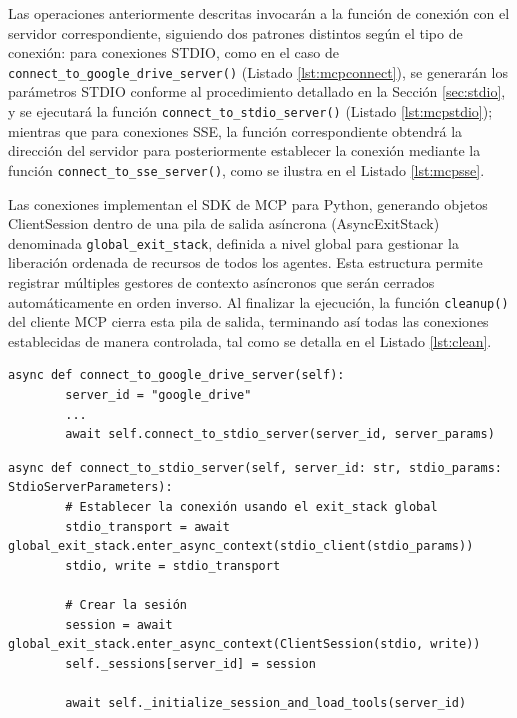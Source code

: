 Las operaciones anteriormente descritas invocarán a la función de conexión con el servidor correspondiente, siguiendo dos patrones distintos según el tipo de conexión: para conexiones STDIO, como en el caso de \texttt{connect\_to\_google\_drive\_server()} (Listado \ref{lst:mcpconnect}), se generarán los parámetros STDIO conforme al procedimiento detallado en la Sección \ref{sec:stdio}, y se ejecutará la función \texttt{connect\_to\_stdio\_server()} (Listado \ref{lst:mcpstdio}); mientras que para conexiones SSE, la función correspondiente obtendrá la dirección del servidor para posteriormente establecer la conexión mediante la función \texttt{connect\_to\_sse\_server()}, como se ilustra en el Listado \ref{lst:mcpsse}.

Las conexiones implementan el SDK de MCP para Python, generando objetos ClientSession dentro de una pila de salida asíncrona (AsyncExitStack) denominada \texttt{global\_exit\_stack}, definida a nivel global para gestionar la liberación ordenada de recursos de todos los agentes. Esta estructura permite registrar múltiples gestores de contexto asíncronos que serán cerrados automáticamente en orden inverso. Al finalizar la ejecución, la función \texttt{cleanup()} del cliente MCP cierra esta pila de salida, terminando así todas las conexiones establecidas de manera controlada, tal como se detalla en el Listado \ref{lst:clean}. 

\begin{lstlisting}[caption={mcp\_multi\_client.py: función \texttt{connect\_to\_google\_drive\_server en Cliente MCP}},label={lst:mcpconnect}]
    async def connect_to_google_drive_server(self):
        server_id = "google_drive"
        ...
        await self.connect_to_stdio_server(server_id, server_params)
\end{lstlisting}

\begin{lstlisting}[caption={mcp\_multi\_client.py: función \texttt{connect\_to\_stdio\_server en cliente MCP}},label={lst:mcpstdio}]
    async def connect_to_stdio_server(self, server_id: str, stdio_params: StdioServerParameters):
        # Establecer la conexión usando el exit_stack global
        stdio_transport = await global_exit_stack.enter_async_context(stdio_client(stdio_params))
        stdio, write = stdio_transport

        # Crear la sesión
        session = await global_exit_stack.enter_async_context(ClientSession(stdio, write))
        self._sessions[server_id] = session

        await self._initialize_session_and_load_tools(server_id)

\end{lstlisting}

